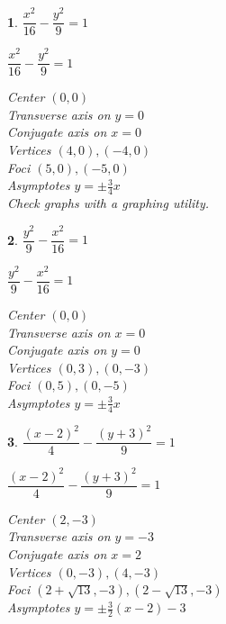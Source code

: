 \documentclass{amsbook}
\newtheorem{exc}{}
\newenvironment{ex}{\begin{exc}\normalfont}{\end{exc}}
\numberwithin{section}{chapter}
\numberwithin{equation}{chapter}
\begin{document}
\begin{multicols}{2}
	
	\begin{ex}
		$\dfrac{x^{2}}{16} - \dfrac{y^{2}}{9} = 1$
		\begin{sol}
		$\dfrac{x^{2}}{16} - \dfrac{y^{2}}{9} = 1$
		
		Center $(0, 0)$\\
		Transverse axis on $y = 0$\\
		Conjugate axis on $x = 0$\\
		Vertices $(4, 0), (-4, 0)$\\
		Foci $(5, 0), (-5, 0)$\\
		Asymptotes $y = \pm \frac{3}{4} x$\\
		
		Check graphs with a graphing utility.	
		\end{sol}
	\end{ex}
	
	\begin{ex}
		 $\dfrac{y^{2}}{9} - \dfrac{x^{2}}{16} = 1$
		\begin{sol}
			$\dfrac{y^{2}}{9} - \dfrac{x^{2}}{16} = 1$
			
			Center $(0, 0)$\\
			Transverse axis on $x = 0$\\
			Conjugate axis on $y = 0$\\
			Vertices $(0, 3), (0, -3)$\\
			Foci $(0, 5), (0, -5)$\\
			Asymptotes $y = \pm \frac{3}{4} x$\\
		\end{sol}
	\end{ex}
	
	\begin{ex}
		 $\dfrac{(x - 2)^{2}}{4} - \dfrac{(y + 3)^{2}}{9} = 1$
		\begin{sol}
		$\dfrac{(x - 2)^{2}}{4} - \dfrac{(y + 3)^{2}}{9} = 1$
		
		Center $(2, -3)$\\
		Transverse axis on $y = -3$\\
		Conjugate axis on $x = 2$\\
		Vertices $(0, -3), (4, -3)$\\
		Foci $(2 + \sqrt{13}, -3), (2 - \sqrt{13}, -3)$\\
		Asymptotes $y = \pm \frac{3}{2}(x - 2) - 3$\\
			
		\end{sol}
	\end{ex}
	

\end{multicols}
\end{document}
